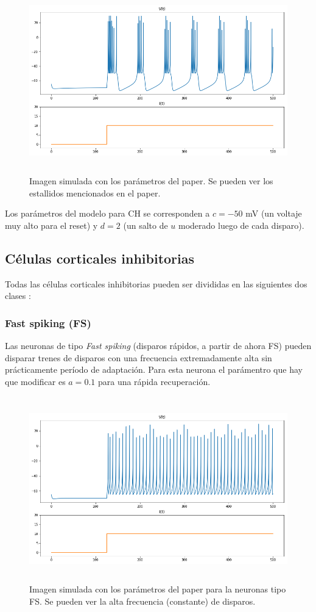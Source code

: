 \documentclass[12pt]{article}
\begin{document}
 \begin{figure}[h!]
    \centering
        \includegraphics[height=8cm]{images/CH.png}
    \caption[fontsize=2pt]{Imagen simulada con los parámetros del paper. Se pueden ver los estallidos mencionados en el paper.}
\end{figure}

Los parámetros del modelo para CH se corresponden a $c = -50$ mV (un voltaje muy alto para el reset) y $d = 2$ (un salto de $u$ moderado luego de cada disparo).

\subsection{Células corticales inhibitorias}
Todas las células corticales inhibitorias pueden ser divididas en las siguientes dos clases \cite{inhibitorias}:

\subsubsection{Fast spiking (FS)}
Las neuronas de tipo \textit{Fast spiking} (disparos rápidos, a partir de ahora FS) pueden disparar trenes de disparos con una frecuencia extremadamente alta sin prácticamente período de adaptación.
Para esta neurona el parámentro que hay que modificar es $a = 0.1$ para una rápida recuperación.

\begin{figure}[h!]
    \centering
        \includegraphics[height=8cm]{images/FS.png}
    \caption[fontsize=2pt]{Imagen simulada con los parámetros del paper para la neuronas tipo FS. Se pueden ver la alta frecuencia (constante) de disparos.}
\end{figure}
\end{document}

